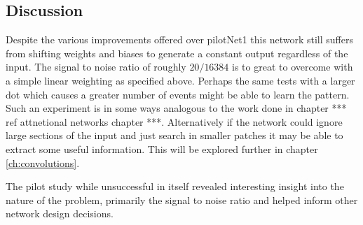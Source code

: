 \subsection{Discussion}
Despite the various improvements offered over pilotNet1 this network still suffers from shifting weights and biases to generate a constant output regardless of the input. 
The signal to noise ratio of roughly $20/16384$ is to great to overcome with a simple linear weighting as specified above.
Perhaps the same tests with a larger dot which causes a greater number of events might be able to learn the pattern. 
Such an experiment is in some ways analogous to the work done in chapter *** ref attnetional networks chapter ***. 
Alternatively if the network could ignore large sections of the input and just search in smaller patches it may be able to extract some useful information.
This will be explored further in chapter \ref{ch:convolutions}. 

The pilot study while unsuccessful in itself revealed interesting insight into the nature of the problem, primarily the signal to noise ratio and helped inform other network design decisions.
 




























